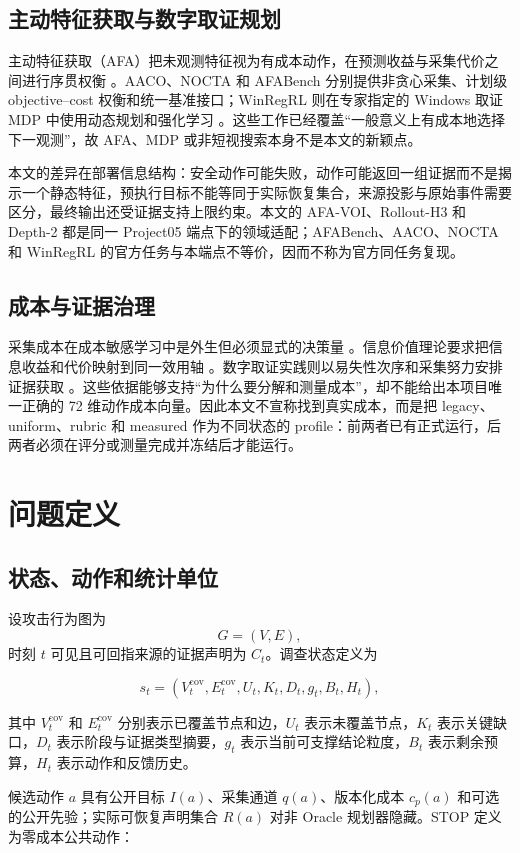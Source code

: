 \documentclass[conference,a4paper,10pt]{IEEEtran}
\begin{document}
\subsection{主动特征获取与数字取证规划}
主动特征获取（AFA）把未观测特征视为有成本动作，在预测收益与采集代价之间进行序贯权衡 \cite{ref11}。AACO、NOCTA 和 AFABench 分别提供非贪心采集、计划级 objective–cost 权衡和统一基准接口；WinRegRL 则在专家指定的 Windows 取证 MDP 中使用动态规划和强化学习 \cite{ref12,ref13,ref14,ref15}。这些工作已经覆盖“一般意义上有成本地选择下一观测”，故 AFA、MDP 或非短视搜索本身不是本文的新颖点。

本文的差异在部署信息结构：安全动作可能失败，动作可能返回一组证据而不是揭示一个静态特征，预执行目标不能等同于实际恢复集合，来源投影与原始事件需要区分，最终输出还受证据支持上限约束。本文的 AFA-VOI、Rollout-H3 和 Depth-2 都是同一 Project05 端点下的领域适配；AFABench、AACO、NOCTA 和 WinRegRL 的官方任务与本端点不等价，因而不称为官方同任务复现。

\subsection{成本与证据治理}
采集成本在成本敏感学习中是外生但必须显式的决策量 \cite{ref16,ref17}。信息价值理论要求把信息收益和代价映射到同一效用轴 \cite{ref18}。数字取证实践则以易失性次序和采集努力安排证据获取 \cite{ref19,ref20}。这些依据能够支持“为什么要分解和测量成本”，却不能给出本项目唯一正确的 72 维动作成本向量。因此本文不宣称找到真实成本，而是把 legacy、uniform、rubric 和 measured 作为不同状态的 profile：前两者已有正式运行，后两者必须在评分或测量完成并冻结后才能运行。

\section{问题定义}
\subsection{状态、动作和统计单位}
设攻击行为图为
\[
G=(V,E),
\]
时刻 \(t\) 可见且可回指来源的证据声明为 \(C_t\)。调查状态定义为

\[
s_t=(V_t^{\mathrm{cov}},E_t^{\mathrm{cov}},U_t,K_t,D_t,g_t,B_t,H_t),
\]

其中 \(V_t^{\mathrm{cov}}\) 和 \(E_t^{\mathrm{cov}}\) 分别表示已覆盖节点和边，\(U_t\) 表示未覆盖节点，\(K_t\) 表示关键缺口，\(D_t\) 表示阶段与证据类型摘要，\(g_t\) 表示当前可支撑结论粒度，\(B_t\) 表示剩余预算，\(H_t\) 表示动作和反馈历史。

候选动作 \(a\) 具有公开目标 \(I(a)\)、采集通道 \(q(a)\)、版本化成本 \(c_p(a)\) 和可选的公开先验；实际可恢复声明集合 \(R(a)\) 对非 Oracle 规划器隐藏。STOP 定义为零成本公共动作：
\end{document}
